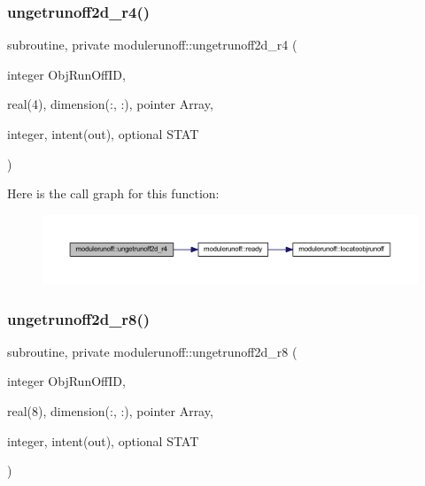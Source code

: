 \subsubsection{\texorpdfstring{ungetrunoff2d\+\_\+r4()}{ungetrunoff2d\_r4()}}
{\footnotesize\ttfamily subroutine, private modulerunoff\+::ungetrunoff2d\+\_\+r4 (\begin{DoxyParamCaption}\item[{integer}]{Obj\+Run\+Off\+ID,  }\item[{real(4), dimension(\+:, \+:), pointer}]{Array,  }\item[{integer, intent(out), optional}]{S\+T\+AT }\end{DoxyParamCaption})\hspace{0.3cm}{\ttfamily [private]}}

Here is the call graph for this function\+:
\nopagebreak
\begin{figure}[H]
\begin{center}
\leavevmode
\includegraphics[width=350pt]{namespacemodulerunoff_acd023a67da604bbfb903587e80244138_cgraph}
\end{center}
\end{figure}
\mbox{\label{namespacemodulerunoff_af00779fc9a81a3cdf2947f1c7990d1c8}} 
\subsubsection{\texorpdfstring{ungetrunoff2d\+\_\+r8()}{ungetrunoff2d\_r8()}}
{\footnotesize\ttfamily subroutine, private modulerunoff\+::ungetrunoff2d\+\_\+r8 (\begin{DoxyParamCaption}\item[{integer}]{Obj\+Run\+Off\+ID,  }\item[{real(8), dimension(\+:, \+:), pointer}]{Array,  }\item[{integer, intent(out), optional}]{S\+T\+AT }\end{DoxyParamCaption})\hspace{0.3cm}{\ttfamily [private]}}

